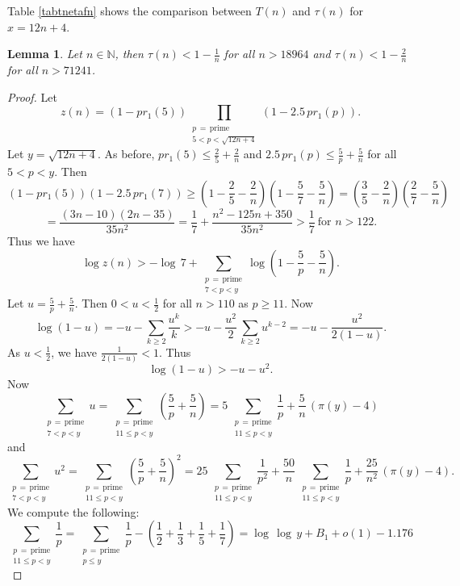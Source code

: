 \documentclass[11pt]{article}
\newtheorem{lemma}[theorem]{Lemma}
\theoremstyle{definition}
\theoremstyle{remark}
\numberwithin{equation}{section}
\newcommand{\Nat}{\mathbb{N}}
\begin{document}
\noindent
Table \ref{tabtnetafn} shows the comparison between $T(n)$ and $\tau(n)$ for $x=12n+4$.

\begin{lemma}\label{lem2good}
Let $n\in\Nat$, then $\tau(n)<1-\frac{1}{n}$ for all $n>18964$ and $\tau(n)<1-\frac{2}{n}$ for all $n>71241$. 
\end{lemma}

\begin{proof}
Let
$$z(n)=(1-pr_1(5))\prod\limits_{\substack{p\, =\, \text{prime}\\ 5<p<\sqrt{12n+4}}} (1-2.5\, pr_1(p)).$$
Let $y=\sqrt{12n+4}$. As before, $pr_1(5)\leq \frac{2}{5}+\frac{2}{n}$ and $2.5\, pr_1(p)\leq \frac{5}{p}+\frac{5}{n}$ for all $5<p<y$. Then 
$$(1-pr_1(5))(1-2.5\, pr_1(7))\geq \left(1-\frac{2}{5}-\frac{2}{n}\right) \left(1-\frac{5}{7}-\frac{5}{n}\right) =
\left(\frac{3}{5}-\frac{2}{n}\right) \left(\frac{2}{7}-\frac{5}{n}\right)$$
$$=\frac{(3n-10)(2n-35)}{35n^2}=\frac{1}{7}+\frac{n^2-125n+350}{35n^2}>\frac{1}{7}\ \text{for } n>122.$$
Thus we have
$$\log z(n)>-\log\, 7+\sum\limits_{\substack{p\, =\, \text{prime}\\ 7<p<y}} \log \left(1-\frac{5}{p}-\frac{5}{n}\right).$$
Let $u=\frac{5}{p}+\frac{5}{n}$. Then $0<u<\frac{1}{2}$ for all $n>110$ as $p\geq 11$. Now
$$\log(1-u)=-u-\sum\limits_{k\geq 2} \frac{u^k}{k}>-u-\frac{u^2}{2}\, \sum\limits_{k\geq 2} u^{k-2}=-u-\frac{u^2}{2(1-u)}.$$
As $u<\frac{1}{2}$, we have $\frac{1}{2(1-u)}<1$. Thus 
$$\log(1-u)>-u-u^2.$$
Now 
$$\sum\limits_{\substack{p\, =\, \text{prime}\\ 7<p<y}} u=\sum\limits_{\substack{p\, =\, \text{prime}\\ 11\leq p<y}} \left(\frac{5}{p}+\frac{5}{n}\right) =5\, \sum\limits_{\substack{p\, =\, \text{prime}\\ 11\leq p<y}} \frac{1}{p} +\frac{5}{n} \, (\pi(y)-4)$$
and 
$$\sum\limits_{\substack{p\, =\, \text{prime}\\ 7<p<y}} u^2=\sum\limits_{\substack{p\, =\, \text{prime}\\ 11\leq p<y}} \left(\frac{5}{p}+\frac{5}{n}\right)^2 =25\, \sum\limits_{\substack{p\, =\, \text{prime}\\ 11\leq p<y}} \frac{1}{p^2} +\frac{50}{n} \, \sum\limits_{\substack{p\, =\, \text{prime}\\ 11\leq p<y}} \frac{1}{p}+\frac{25}{n^2}\, (\pi(y)-4).$$
We compute the following: 
$$\sum\limits_{\substack{p\, =\, \text{prime}\\ 11\leq p<y}} \frac{1}{p}=\sum\limits_{\substack{p\, =\, \text{prime}\\ p\leq y}} \frac{1}{p} -\left(\frac{1}{2}+\frac{1}{3}+\frac{1}{5}+\frac{1}{7}\right)=\log\, \log\, y +B_1+o(1)-1.176$$

\end{proof}
\end{document}
